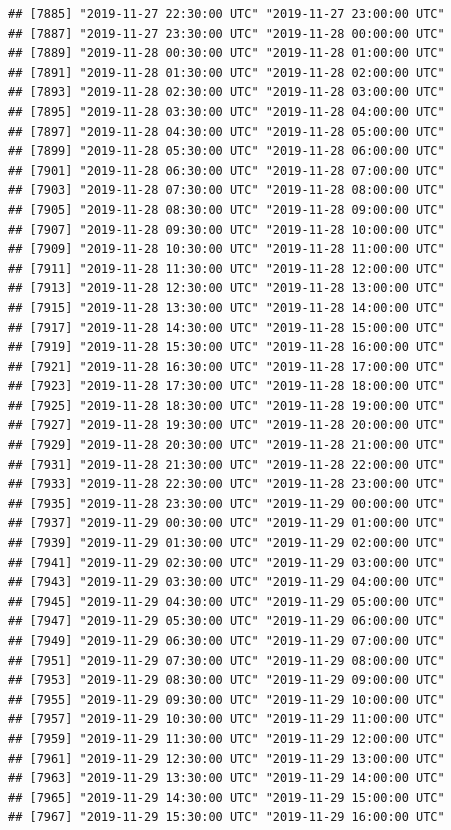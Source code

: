 \documentclass{article}\usepackage[]{graphicx}\usepackage[]{color}
\makeatletter
\newenvironment{kframe}{%
 \def\at@end@of@kframe{}%
 \ifinner\ifhmode%
  \def\at@end@of@kframe{\end{minipage}}%
  \begin{minipage}{\columnwidth}%
 \fi\fi%
 \def\FrameCommand##1{\hskip\@totalleftmargin \hskip-\fboxsep
 \colorbox{shadecolor}{##1}\hskip-\fboxsep
     \hskip-\linewidth \hskip-\@totalleftmargin \hskip\columnwidth}%
 \MakeFramed {\advance\hsize-\width
   \@totalleftmargin\z@ \linewidth\hsize
   \@setminipage}}%
 {\par\unskip\endMakeFramed%
 \at@end@of@kframe}
\newenvironment{knitrout}{}{} %
\makeatother
\begin{document}
\begin{knitrout}
\begin{kframe}
\begin{verbatim}
## [7885] "2019-11-27 22:30:00 UTC" "2019-11-27 23:00:00 UTC"
## [7887] "2019-11-27 23:30:00 UTC" "2019-11-28 00:00:00 UTC"
## [7889] "2019-11-28 00:30:00 UTC" "2019-11-28 01:00:00 UTC"
## [7891] "2019-11-28 01:30:00 UTC" "2019-11-28 02:00:00 UTC"
## [7893] "2019-11-28 02:30:00 UTC" "2019-11-28 03:00:00 UTC"
## [7895] "2019-11-28 03:30:00 UTC" "2019-11-28 04:00:00 UTC"
## [7897] "2019-11-28 04:30:00 UTC" "2019-11-28 05:00:00 UTC"
## [7899] "2019-11-28 05:30:00 UTC" "2019-11-28 06:00:00 UTC"
## [7901] "2019-11-28 06:30:00 UTC" "2019-11-28 07:00:00 UTC"
## [7903] "2019-11-28 07:30:00 UTC" "2019-11-28 08:00:00 UTC"
## [7905] "2019-11-28 08:30:00 UTC" "2019-11-28 09:00:00 UTC"
## [7907] "2019-11-28 09:30:00 UTC" "2019-11-28 10:00:00 UTC"
## [7909] "2019-11-28 10:30:00 UTC" "2019-11-28 11:00:00 UTC"
## [7911] "2019-11-28 11:30:00 UTC" "2019-11-28 12:00:00 UTC"
## [7913] "2019-11-28 12:30:00 UTC" "2019-11-28 13:00:00 UTC"
## [7915] "2019-11-28 13:30:00 UTC" "2019-11-28 14:00:00 UTC"
## [7917] "2019-11-28 14:30:00 UTC" "2019-11-28 15:00:00 UTC"
## [7919] "2019-11-28 15:30:00 UTC" "2019-11-28 16:00:00 UTC"
## [7921] "2019-11-28 16:30:00 UTC" "2019-11-28 17:00:00 UTC"
## [7923] "2019-11-28 17:30:00 UTC" "2019-11-28 18:00:00 UTC"
## [7925] "2019-11-28 18:30:00 UTC" "2019-11-28 19:00:00 UTC"
## [7927] "2019-11-28 19:30:00 UTC" "2019-11-28 20:00:00 UTC"
## [7929] "2019-11-28 20:30:00 UTC" "2019-11-28 21:00:00 UTC"
## [7931] "2019-11-28 21:30:00 UTC" "2019-11-28 22:00:00 UTC"
## [7933] "2019-11-28 22:30:00 UTC" "2019-11-28 23:00:00 UTC"
## [7935] "2019-11-28 23:30:00 UTC" "2019-11-29 00:00:00 UTC"
## [7937] "2019-11-29 00:30:00 UTC" "2019-11-29 01:00:00 UTC"
## [7939] "2019-11-29 01:30:00 UTC" "2019-11-29 02:00:00 UTC"
## [7941] "2019-11-29 02:30:00 UTC" "2019-11-29 03:00:00 UTC"
## [7943] "2019-11-29 03:30:00 UTC" "2019-11-29 04:00:00 UTC"
## [7945] "2019-11-29 04:30:00 UTC" "2019-11-29 05:00:00 UTC"
## [7947] "2019-11-29 05:30:00 UTC" "2019-11-29 06:00:00 UTC"
## [7949] "2019-11-29 06:30:00 UTC" "2019-11-29 07:00:00 UTC"
## [7951] "2019-11-29 07:30:00 UTC" "2019-11-29 08:00:00 UTC"
## [7953] "2019-11-29 08:30:00 UTC" "2019-11-29 09:00:00 UTC"
## [7955] "2019-11-29 09:30:00 UTC" "2019-11-29 10:00:00 UTC"
## [7957] "2019-11-29 10:30:00 UTC" "2019-11-29 11:00:00 UTC"
## [7959] "2019-11-29 11:30:00 UTC" "2019-11-29 12:00:00 UTC"
## [7961] "2019-11-29 12:30:00 UTC" "2019-11-29 13:00:00 UTC"
## [7963] "2019-11-29 13:30:00 UTC" "2019-11-29 14:00:00 UTC"
## [7965] "2019-11-29 14:30:00 UTC" "2019-11-29 15:00:00 UTC"
## [7967] "2019-11-29 15:30:00 UTC" "2019-11-29 16:00:00 UTC"

\end{verbatim}
\end{kframe}
\end{knitrout}
\end{document}
